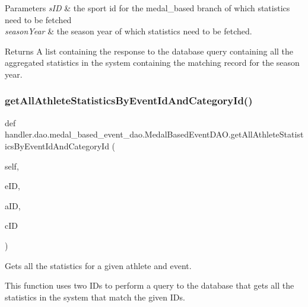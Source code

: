 \begin{DoxyParams}{Parameters}
{\em s\+ID} & the sport id for the medal\+\_\+based branch of which statistics need to be fetched \\
\hline
{\em season\+Year} & the season year of which statistics need to be fetched.\\
\hline
\end{DoxyParams}
\begin{DoxyReturn}{Returns}
A list containing the response to the database query containing all the aggregated statistics in the system containing the matching record for the season year. 
\end{DoxyReturn}
\mbox{\label{classhandler_1_1dao_1_1medal__based__event__dao_1_1_medal_based_event_d_a_o_a8ceb90dc3affba4dc5c03639ff3ad2de}} 
\subsubsection{\texorpdfstring{get\+All\+Athlete\+Statistics\+By\+Event\+Id\+And\+Category\+Id()}{getAllAthleteStatisticsByEventIdAndCategoryId()}}
{\footnotesize\ttfamily def handler.\+dao.\+medal\+\_\+based\+\_\+event\+\_\+dao.\+Medal\+Based\+Event\+D\+A\+O.\+get\+All\+Athlete\+Statistics\+By\+Event\+Id\+And\+Category\+Id (\begin{DoxyParamCaption}\item[{}]{self,  }\item[{}]{e\+ID,  }\item[{}]{a\+ID,  }\item[{}]{c\+ID }\end{DoxyParamCaption})}



Gets all the statistics for a given athlete and event. 

This function uses two I\+Ds to perform a query to the database that gets all the statistics in the system that match the given I\+Ds.


